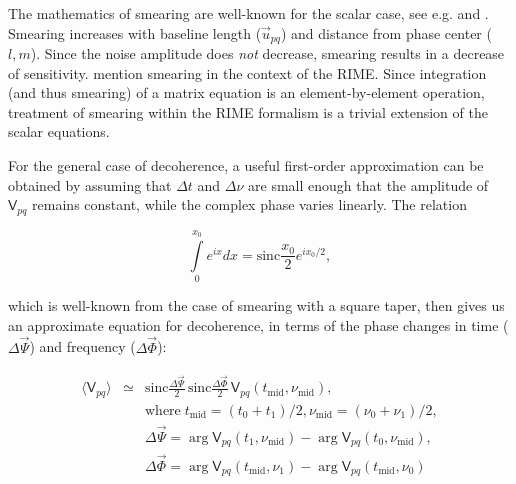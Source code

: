 \documentclass[]{aa}
\newcommand{\coh}[2]{\mathsf{{#1}}_{{#2}}}
\begin{document}
The mathematics of smearing are well-known for the scalar case, see e.g. \citet[Sect.~6.4]{tms} and \citet{Bridle:smearing}. Smearing increases with baseline length ($\vec u_{pq}$) and distance from phase center ($l,m$). Since the noise amplitude does {\em not} decrease, smearing results in a decrease of sensitivity. \citet{ME1} mention smearing in the context of the RIME. Since integration (and thus smearing) of a matrix equation is an element-by-element operation,  treatment of smearing within the RIME formalism is a trivial extension of the scalar equations.

For the general case of decoherence, a useful first-order approximation can be obtained by assuming that $\Delta t$ and $\Delta\nu$ are small enough that the amplitude of $\coh{V}{pq}$ remains constant, while the complex phase varies linearly. The relation

\[
\int\limits_{0}^{x_0}e^{ix}dx = \mathrm{sinc}\frac{x_0}{2}e^{ix_0/2},
\]

which is well-known from the case of smearing with a square taper, then gives us an approximate equation for decoherence, in terms of the phase changes in time ($\Delta\vec\Psi$) and frequency ($\Delta\vec\Phi$):

\begin{eqnarray}\label{eq:smearing}
\langle \coh{V}{pq} \rangle & \simeq & \mathrm{sinc}\frac{\Delta\vec\Psi}{2}\,\mathrm{sinc}\frac{\Delta\vec\Phi}{2}\,\coh{V}{pq}(t_\mathrm{mid},\nu_\mathrm{mid}), \\
\nonumber && \mathrm{where} \; t_\mathrm{mid} = (t_0+t_1)/2, \nu_\mathrm{mid} = (\nu_0+\nu_1)/2, \\
\nonumber && \Delta\vec\Psi = \arg \coh{V}{pq}(t_1,\nu_\mathrm{mid}) - \arg \coh{V}{pq}(t_0,\nu_\mathrm{mid}), \\
\nonumber && \Delta\vec\Phi = \arg \coh{V}{pq}(t_\mathrm{mid},\nu_1) - \arg \coh{V}{pq}(t_\mathrm{mid},\nu_0) 
\end{eqnarray}
\end{document}

